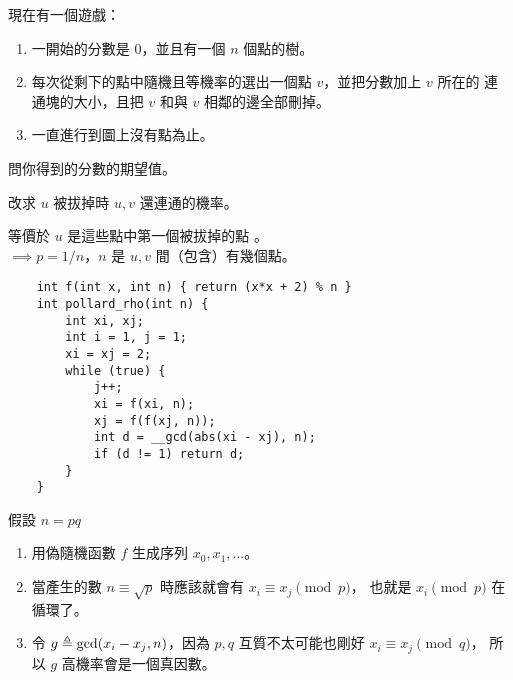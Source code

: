 \documentclass[standalone]{beamer}
\begin{document}
\begin{frame}{}
  \begin{problem}
    現在有一個遊戲：
    \begin{enumerate}[<+->]
      \item 一開始的分數是 $0$，並且有一個 $n$ 個點的樹。
      \item 每次從剩下的點中隨機且等機率的選出一個點 $v$，並把分數加上 $v$ 所在的
        連通塊的大小，且把 $v$ 和與 $v$ 相鄰的邊全部刪掉。
      \item 一直進行到圖上沒有點為止。
    \end{enumerate} \pause

    問你得到的分數的期望值。
  \end{problem}
\end{frame}

\begin{frame}{}
  改求 $u$ 被拔掉時 $u, v$ 還連通的機率。 \pause
  \begin{figure}
  \end{figure} \pause

  等價於 $u$ 是這些點中第一個被拔掉的點 \pause。 \\
  $\implies p = 1/n$，$n$ 是 $u, v$ 間（包含）有幾個點。
\end{frame}

\begin{frame}[fragile]
  \begin{verbatim}
    int f(int x, int n) { return (x*x + 2) % n }
    int pollard_rho(int n) {
        int xi, xj;
        int i = 1, j = 1;
        xi = xj = 2;
        while (true) {
            j++;
            xi = f(xi, n);
            xj = f(f(xj, n));
            int d = __gcd(abs(xi - xj), n);
            if (d != 1) return d;
        }
    }
  \end{verbatim}
\end{frame}

\begin{frame}{}
  假設 $n = pq$ \pause
  \begin{enumerate}[<+->]
    \item 用偽隨機函數 $f$ 生成序列 $x_0, x_1, \dots $。
    \item 當產生的數 $n \equiv \sqrt{p}$ 時應該就會有 $x_i \equiv x_j \pmod{p}$，
      也就是 $x_i \pmod{p}$ 在循環了。
    \item 令 $g \triangleq \gcd(x_i - x_j, n)$，因為 $p, q$ 互質不太可能也剛好 $x_i \equiv x_j \pmod{q}$，
      所以 $g$ 高機率會是一個真因數。
  \end{enumerate}
\end{frame}
\end{document}
